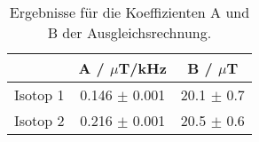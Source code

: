 \begin{table}
  \caption{Ergebnisse für die Koeffizienten A und B der Ausgleichsrechnung.}
  \label{tab:isoFit}
  \centering
\begin{tabular}{ccc} \toprule
 & A / $\mu$T/kHz  & B / $\mu$T \\ \midrule
Isotop 1 & 0.146 $\pm$ 0.001 & 20.1 $\pm$ 0.7 \\
Isotop 2 & 0.216 $\pm$ 0.001 & 20.5 $\pm$ 0.6 \\
\bottomrule
\end{tabular}
\end{table}